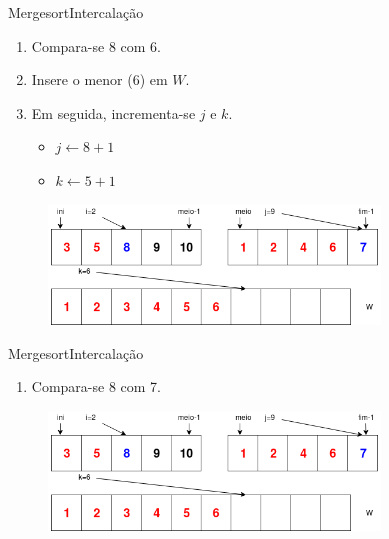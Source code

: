 \documentclass[aspectratio=169]{beamer}
\begin{document}
\begin{frame}{Mergesort}{Intercalação}
\begin{enumerate}
 \item Compara-se 8 com 6.
 \item Insere o menor (6) em $W$.
 \item Em seguida, incrementa-se $j$ e $k$.
 \begin{itemize}
 \item $j\leftarrow 8 + 1$
 \item $k\leftarrow 5 + 1$
 \end{itemize}  
\end{enumerate}

\begin{figure}[!h]
  \centering
  \includegraphics[width=250pt]{imgs/merge/merge7.png}
  \label{fig_merge6_2}
\end{figure}
\end{frame}


\begin{frame}{Mergesort}{Intercalação}
\begin{enumerate}
 \item Compara-se 8 com 7.
\end{enumerate}

\begin{figure}[!h]
  \centering
  \includegraphics[width=250pt]{imgs/merge/merge7.png}
  \label{fig_merge7}
\end{figure}
\end{frame}

\end{document}
